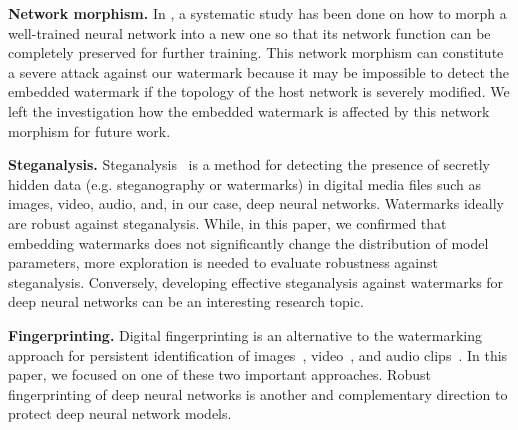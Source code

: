 \documentclass[10pt,twocolumn,letterpaper]{article}
\begin{document}
\textbf{Network morphism.}
In \cite{Chen_iclr16, Wei_icml16}, a systematic study has been done on how to morph a well-trained neural network into a new one so that its network function can be completely preserved for further training.
This network morphism can constitute a severe attack against our watermark because it may be impossible to detect the embedded watermark if the topology of the host network is 	severely modified.
We left the investigation how the embedded watermark is affected by this network morphism for future work.

\textbf{Steganalysis.} Steganalysis~\cite{shaohui_icme03, kodovsky_tifs12} is a method for detecting the presence of secretly hidden data (e.g. steganography or watermarks) in digital media files such as images, video, audio, and, in our case, deep neural networks.
Watermarks ideally are robust against steganalysis.
While, in this paper, we confirmed that embedding watermarks does not significantly change the distribution of model parameters, more exploration is needed to evaluate robustness against steganalysis.
Conversely, developing effective steganalysis against watermarks for deep neural networks can be an interesting research topic.

\textbf{Fingerprinting.} Digital fingerprinting is an alternative to the watermarking approach for persistent identification of images~\cite{bar_icassp03}, video~\cite{jol05, uch_icmr11}, and audio clips~\cite{ang_icme12, hai02}.
In this paper, we focused on one of these two important approaches.
Robust fingerprinting of deep neural networks is another and complementary direction to protect deep neural network models.





{\small


}
\end{document}
